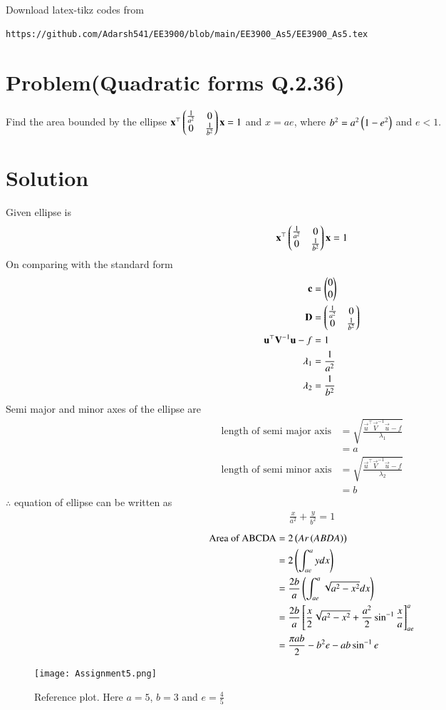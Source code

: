 \documentclass[journal,12pt,twocolumn]{IEEEtran}
\begin{document}
%
Download latex-tikz codes from 
%
\begin{lstlisting}
https://github.com/Adarsh541/EE3900/blob/main/EE3900_As5/EE3900_As5.tex
\end{lstlisting}
\section{Problem(Quadratic forms Q.2.36)}
Find the area bounded by the ellipse $\Vec{x}^{\top}\myvec{\frac{1}{a^2} & 0\\ 0 &\frac{1}{b^2}}\vec{x}=1$ and $x=ae$, where $b^2=a^2\left(1-e^2\right)$ and $e<1$.
\section{Solution}
Given ellipse is 
\begin{align}
    \Vec{x}^{\top}\myvec{\frac{1}{a^2} & 0\\ 0 &\frac{1}{b^2}}\vec{x}=1
\end{align}
On comparing with the standard form
\begin{align}
    \mathbf{c}&=\begin{pmatrix}0\\0\end{pmatrix}\\
    \mathbf{D}&=\begin{pmatrix}\frac{1}{a^2} & 0\\ 0 &\frac{1}{b^2}\end{pmatrix}\\
    \mathbf{u}^{\top}\mathbf{V}^{-1}\mathbf{u}-f&=1\\
    \lambda_1&=\frac{1}{a^2}\\
    \lambda_2&=\frac{1}{b^2}
\end{align}
Semi major and minor axes of the ellipse are
\begin{align}
    \text{length of semi major axis}&=\sqrt{\frac{\vec{u}^{\top}\vec{V}^{-1}\vec{u}-f}{\lambda_1}}\\
    &=a\\
    \text{length of semi minor axis}&=\sqrt{\frac{\vec{u}^{\top}\vec{V}^{-1}\vec{u}-f}{\lambda_2}}\\
    &=b
\end{align}
$\therefore$ equation of ellipse can be written as
\begin{align}
    \frac{x}{a^2}+\frac{y}{b^2}=1
\end{align}
\begin{align}
    \text{Area of ABCDA}&=2\left(Ar\left(ABDA\right)\right)\\
    &=2\left(\int_{ae}^{a}ydx\right)\\
    &=\frac{2b}{a}\left(\int_{ae}^{a}\sqrt{a^2-x^2}dx\right)\\
    &=\frac{2b}{a}{}\left[\frac{x}{2}\sqrt{a^2-x^2}+\frac{a^2}{2}\sin^{-1}{\frac{x}{a}}\right]_{ae}^{a}\\
    &=\frac{\pi ab}{2}-b^2e-ab\sin^{-1}{e}
\end{align}
\begin{figure}[!h]
 \centering
 \texttt{[image: Assignment5.png]}
 \caption{Reference plot. Here $a=5$, $b=3$ and $e=\frac{4}{5}$}
 \label{plot}
\end{figure}
\end{document}
